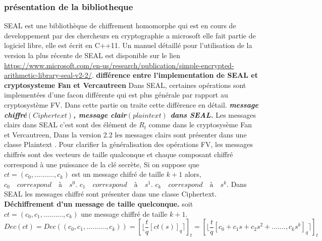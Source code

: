 \documentclass[a4paper,12pt]{report}
\begin{document}
\subsubsection{présentation de la bibliotheque}
SEAL est une bibliothèque de chiffrement homomorphe qui est en cours de developpement par des chercheurs en cryptographie a microsoft elle fait partie de logiciel libre, elle est écrit en C++11.
Un manuel détaillé pour l'utilisation de la version la plus récente de SEAL est disponible sur le lien \url{https://www.microsoft.com/en-us/research/publication/simple-encrypted-arithmetic-library-seal-v2-2/}. \newline
 \newline
\textbf{différence entre l'implementation de SEAL et cryptosysteme Fan et Vercautreen}  \newline
Dans SEAL, certaines opérations sont implementées d'une facon différente qui est plus générale par rapport au cryptosystème FV.\newline
Dans cette partie on traite cette différence en détail.\newline
\textbf{\textit{message chiffré$(Ciphertext)$, message clair$(plaintext)$ dans SEAL.}}\newline
Les messages clairs dans SEAL c'est sont des élément de $R_t$ comme dans le cryptosysème Fan et Vercautreen,
Dans la version 2.2 les messages clairs sont présenter dans une classe Plaintext .\newline
Pour clarifier la généralisation des opérations FV, les messages chiffrés sont des vecteurs de taille qualconque et chaque composant chiffré correspond à une puissance de la clé secrète, Si on suppose que $ct = (c_0,..........,c_k)$ est un message chifré de taille $k+1$ alors,\newline
$c_0\quad correspond\quad à\quad s^0.$\newline
$c_1\quad correspond\quad à\quad s^1.$\newline
$c_k\quad correspond\quad à\quad s^k.$
\newline
 Dans SEAL les messages chiffré sont présenter dans une classe Ciphertext.\newline
 \textbf{Déchiffrement d'un message de taille quelconque.}\newline
soit $ct = (c_0, c_1, .........., c_k)$ une message chiffré de taille $k+1.$\newline
$Dec(ct) = Dec((c_0, c_1, .........., c_k)) = [\lfloor\dfrac{t}{q}[ct(s)]_q\rceil]_t = [\lfloor\dfrac{t}{q}[c_0 + c_1s+c_2s^2+.......,c_ks^k]_q\rceil]_t$\newline
\end{document}
